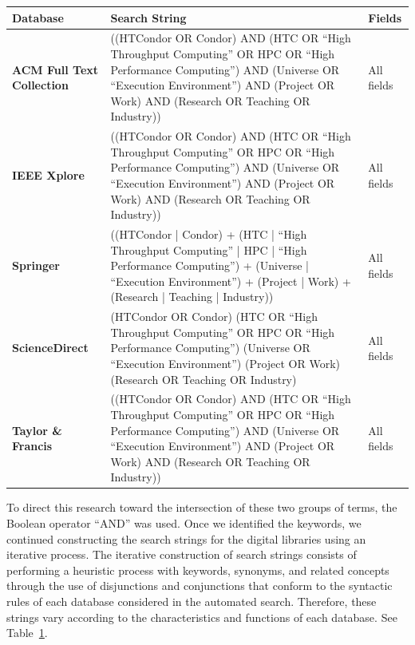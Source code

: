 \begin{table}
	{\renewcommand{\arraystretch}{1.5}
		\begin{tabular}{p{2.5cm}p{8cm}p{2.0cm}} \toprule
			\textbf{Database}                        & \textbf{Search String}                                                                                                                                                                                              & \textbf{Fields} \\
			\midrule
			\textbf{ACM Full Text \hbox{Collection}} & ((HTCondor OR Condor) AND (HTC OR ``High Throughput Computing'' OR HPC OR ``High Performance Computing'') AND (Universe OR ``Execution Environment'') AND (Project OR Work) AND (Research OR Teaching OR Industry)) & All fields      \\
			\textbf{IEEE Xplore}                     & ((HTCondor OR Condor) AND (HTC OR ``High Throughput Computing'' OR HPC OR ``High Performance Computing'') AND (Universe OR ``Execution Environment'') AND (Project OR Work) AND (Research OR Teaching OR Industry)) & All fields      \\
			\textbf{Springer}                        & ((HTCondor | Condor) + (HTC | ``High Throughput Computing'' | HPC | ``High Performance Computing'') + (Universe | ``Execution Environment'') + (Project | Work) + (Research | Teaching | Industry))                 & All fields      \\
			\textbf{ScienceDirect}                   & (HTCondor OR Condor) (HTC OR ``High Throughput Computing'' OR HPC OR ``High Performance Computing'') (Universe OR ``Execution Environment'') (Project OR Work) (Research OR Teaching OR Industry)                   & All fields      \\
			\textbf{Taylor \& Francis}               & ((HTCondor OR Condor) AND (HTC OR ``High Throughput Computing'' OR HPC OR ``High Performance Computing'') AND (Universe OR ``Execution Environment'') AND (Project OR Work) AND (Research OR Teaching OR Industry)) & All fields      \\
			\bottomrule
		\end{tabular}}
	\label{table:cadenas_de_busqueda}
\end{table}


To direct this research toward the intersection of these two groups of terms, the Boolean operator ``AND'' was used. Once we identified the keywords, we continued constructing the search strings for the digital libraries using an iterative process. The iterative construction of search strings consists of performing a heuristic process with keywords, synonyms, and related concepts through the use of disjunctions and conjunctions that conform to the syntactic rules of each database considered in the automated search. Therefore, these strings vary according to the characteristics and functions of each database. See Table~\ref{table:cadenas_de_busqueda}.

